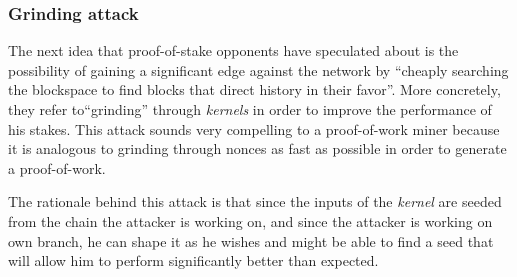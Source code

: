 \documentclass[a4paper,11pt]{article}
\begin{document}


















\subsubsection{Grinding attack}
\label{333}

The next idea that proof-of-stake opponents have speculated about is the possibility of gaining a significant edge against the network by ``cheaply searching the blockspace to find blocks that direct history in their favor''\cite{distributedconsensus}. More concretely, they refer to``grinding'' through \textit{kernels} in order to improve the performance of his stakes. This attack sounds very compelling to a proof-of-work miner because it is analogous to grinding through nonces as fast as possible in order to generate a proof-of-work. 
 
The rationale behind this attack is that since the inputs of the \textit{kernel} are seeded from the chain the attacker is working on, and since the attacker is working on own branch, he can shape it as he wishes and might be able to find a seed that will allow him to perform significantly better than expected.
\end{document}
